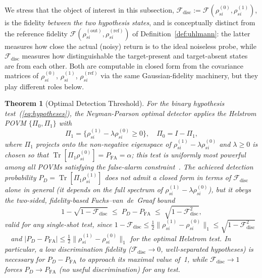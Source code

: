 \documentclass[journal]{IEEEtran}
\newtheorem{theorem}{Theorem}
\DeclareMathOperator{\Tr}{Tr}
\begin{document}
We stress that the object of interest in this subsection, $\mathcal{F}_{\text{disc}} := \mathcal{F}(\rho_{si}^{(0)}, \rho_{si}^{(1)})$, is the fidelity \emph{between the two hypothesis states}, and is conceptually distinct from the reference fidelity $\mathcal{F}(\rho_{si}^{(\text{out})},\rho_{si}^{(\text{ref})})$ of Definition~\ref{def:uhlmann}: the latter measures how close the actual (noisy) return is to the ideal noiseless probe, while $\mathcal F_{\text{disc}}$ measures how distinguishable the target-present and target-absent states are from each other. Both are computable in closed form from the covariance matrices of $\rho_{si}^{(0)}$, $\rho_{si}^{(1)}$, $\rho_{si}^{(\text{ref})}$ via the same Gaussian-fidelity machinery, but they play different roles below.

\begin{theorem}[Optimal Detection Threshold]\label{thm:threshold}
For the binary hypothesis test~(\ref{eq:hypotheses}), the Neyman-Pearson optimal detector applies the Helstrom POVM $\{\Pi_0, \Pi_1\}$ with
\begin{equation}\label{eq:np_povm}
\Pi_1 = \{\rho_{si}^{(1)} - \lambda\rho_{si}^{(0)} \geq 0\}, \quad \Pi_0 = I - \Pi_1,
\end{equation}
where $\Pi_1$ projects onto the non-negative eigenspace of $\rho_{si}^{(1)}-\lambda\rho_{si}^{(0)}$ and $\lambda\geq0$ is chosen so that $\Tr[\Pi_1\rho_{si}^{(0)}] = P_{\text{FA}}=\alpha$; this test is uniformly most powerful among all POVMs satisfying the false-alarm constraint~\cite{helstrom1976quantum}. The achieved detection probability $P_D=\Tr[\Pi_1\rho_{si}^{(1)}]$ does not admit a closed form in terms of $\mathcal F_{\text{disc}}$ alone in general (it depends on the full spectrum of $\rho_{si}^{(1)}-\lambda\rho_{si}^{(0)}$), but it obeys the two-sided, fidelity-based Fuchs--van~de~Graaf bound
\begin{equation}\label{eq:fvdg_bound}
1-\sqrt{1-\mathcal F_{\text{disc}}} \;\leq\; P_D - P_{\text{FA}} \;\leq\; \sqrt{1-\mathcal F_{\text{disc}}^2},
\end{equation}
valid for \emph{any} single-shot test, since $1-\mathcal F_{\text{disc}}\leq\tfrac12\|\rho_{si}^{(1)}-\rho_{si}^{(0)}\|_1\leq\sqrt{1-\mathcal F_{\text{disc}}^2}$~\cite{fuchs1999cryptographic} and $|P_D-P_{\text{FA}}|\leq\tfrac12\|\rho_{si}^{(1)}-\rho_{si}^{(0)}\|_1$ for the optimal Helstrom test. In particular, a low discrimination fidelity ($\mathcal F_{\text{disc}}\to0$, well-separated hypotheses) is necessary for $P_D-P_{\text{FA}}$ to approach its maximal value of~1, while $\mathcal F_{\text{disc}}\to1$ forces $P_D\to P_{\text{FA}}$ (no useful discrimination) for any test.


\end{theorem}
\end{document}
